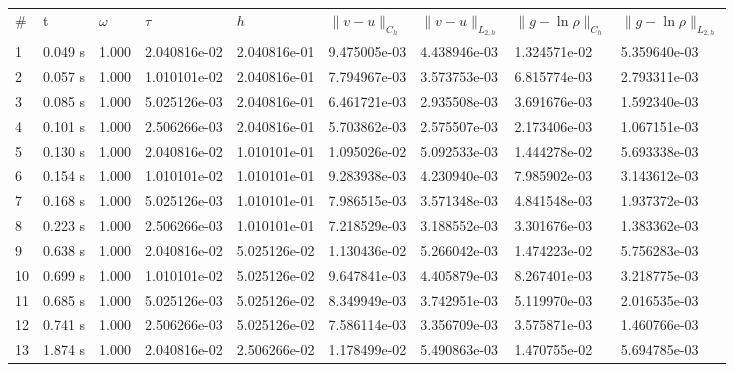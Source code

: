 \documentclass[12pt]{article}
\begin{document}
\begin{center}
\begin{tabular}{lllllllll}
\# & t & $\omega$ & $\tau$ & $h$ & $\|v - u\|_{C_h}$ & $\|v - u\|_{L_{2,h}}$ & $\|g - \ln\rho\|_{C_h}$ & $\|g - \ln\rho\|_{L_{2,h}}$ \\
1 &      0.049 s &      1.000 &      2.040816e-02 &      2.040816e-01 &      9.475005e-03 &      4.438946e-03 &      1.324571e-02 &      5.359640e-03\\
2&      0.057 s&      1.000&      1.010101e-02&      2.040816e-01&      7.794967e-03&      3.573753e-03&      6.815774e-03&      2.793311e-03\\
3&      0.085 s&      1.000&      5.025126e-03&      2.040816e-01&      6.461721e-03&      2.935508e-03&      3.691676e-03&      1.592340e-03\\
4&      0.101 s&      1.000&      2.506266e-03&      2.040816e-01&      5.703862e-03&      2.575507e-03&      2.173406e-03&      1.067151e-03\\
5&      0.130 s&      1.000&      2.040816e-02&      1.010101e-01&      1.095026e-02&      5.092533e-03&      1.444278e-02&      5.693338e-03\\
6&      0.154 s&      1.000&      1.010101e-02&      1.010101e-01&      9.283938e-03&      4.230940e-03&      7.985902e-03&      3.143612e-03\\
7&      0.168 s&      1.000&      5.025126e-03&      1.010101e-01&      7.986515e-03&      3.571348e-03&      4.841548e-03&      1.937372e-03\\
8&      0.223 s&      1.000&      2.506266e-03&      1.010101e-01&      7.218529e-03&      3.188552e-03&      3.301676e-03&      1.383362e-03\\
9&      0.638 s&      1.000&      2.040816e-02&      5.025126e-02&      1.130436e-02&      5.266042e-03&      1.474223e-02&      5.756283e-03\\
10&      0.699 s&      1.000&      1.010101e-02&      5.025126e-02&      9.647841e-03&      4.405879e-03&      8.267401e-03&      3.218775e-03\\
11&      0.685 s&      1.000&      5.025126e-03&      5.025126e-02&      8.349949e-03&      3.742951e-03&      5.119970e-03&      2.016535e-03\\
12&      0.741 s&      1.000&      2.506266e-03&      5.025126e-02&      7.586114e-03&      3.356709e-03&      3.575871e-03&      1.460766e-03\\
13&      1.874 s&      1.000&      2.040816e-02&      2.506266e-02&      1.178499e-02&      5.490863e-03&      1.470755e-02&      5.694785e-03\\

\end{tabular}
\end{center}
\end{document}
